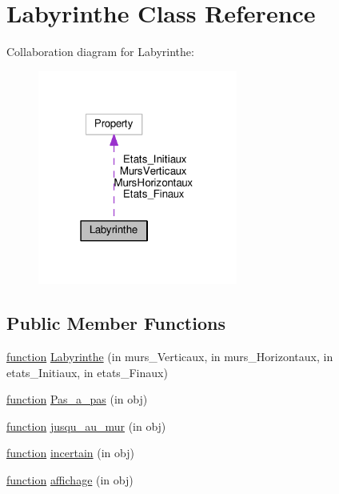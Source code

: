 \hypertarget{class_labyrinthe}{}\section{Labyrinthe Class Reference}
\label{class_labyrinthe}


Collaboration diagram for Labyrinthe\+:
\nopagebreak
\begin{figure}[H]
\begin{center}
\leavevmode
\includegraphics[width=186pt]{class_labyrinthe__coll__graph}
\end{center}
\end{figure}
\subsection*{Public Member Functions}
\begin{DoxyCompactItemize}
\item 
\hyperlink{_plan__desuma_functions_8m_ac2ffb26d6f42d3bbcd7847b0873403f4}{function} \hyperlink{class_labyrinthe_a6fffd8c87c9756d8d7b18294daa29ca5}{Labyrinthe} (in murs\+\_\+\+Verticaux, in murs\+\_\+\+Horizontaux, in etats\+\_\+\+Initiaux, in etats\+\_\+\+Finaux)
\item 
\hyperlink{_plan__desuma_functions_8m_ac2ffb26d6f42d3bbcd7847b0873403f4}{function} \hyperlink{class_labyrinthe_a83ffa74a2a322b1866e7366623a7c4e0}{Pas\+\_\+a\+\_\+pas} (in obj)
\item 
\hyperlink{_plan__desuma_functions_8m_ac2ffb26d6f42d3bbcd7847b0873403f4}{function} \hyperlink{class_labyrinthe_a7b95620bd4b1d31b6d76a5d1a0a4c422}{jusqu\+\_\+au\+\_\+mur} (in obj)
\item 
\hyperlink{_plan__desuma_functions_8m_ac2ffb26d6f42d3bbcd7847b0873403f4}{function} \hyperlink{class_labyrinthe_a6ca8be288490170254d0df6579a59ee3}{incertain} (in obj)
\item 
\hyperlink{_plan__desuma_functions_8m_ac2ffb26d6f42d3bbcd7847b0873403f4}{function} \hyperlink{class_labyrinthe_a961e73a265b479f0e68fdf4600ff9cd7}{affichage} (in obj)
\end{DoxyCompactItemize}
